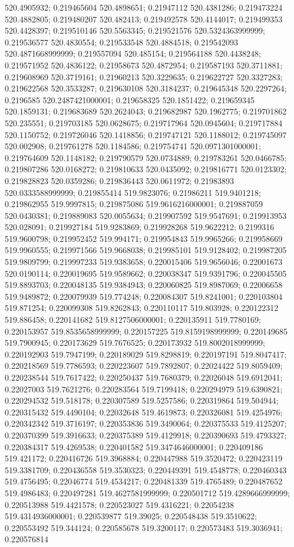 520.4905932; 0.219465604 520.4898651; 0.21947112 520.4381286; 0.219473224 520.4882805; 0.219480207 520.482413; 0.219492578 520.4144017; 0.219499353 520.4428397; 0.219510146 520.5563345; 0.219521576 520.5324363999999; 0.219536577 520.4830554; 0.219533548 520.4884518; 0.219542093 520.4871668999999; 0.219557094 520.485154; 0.219564188 520.4438248; 0.219571952 520.4836122; 0.21958673 520.4872954; 0.219587193 520.3711881; 0.219608969 520.3719161; 0.21960213 520.3229635; 0.219622727 520.3327283; 0.219622568 520.3533287; 0.219630108 520.3184237; 0.219645348 520.2297264; 0.2196585 520.2487421000001; 0.219658325 520.1851422; 0.219659345 520.1859131; 0.219683689 520.2624043; 0.219682987 520.1962775; 0.219701862 520.235551; 0.219703185 520.0628675; 0.219717964 520.0945604; 0.219717884 520.1150752; 0.219726046 520.1418856; 0.219747121 520.1188012; 0.219745097 520.002908; 0.219761278 520.1184586; 0.219754741 520.0971301000001; 0.219764609 520.1148182; 0.219790579 520.0734889; 0.219783261 520.0466785; 0.219807286 520.0168272; 0.219810633 520.0435092; 0.219816771 520.0123302; 0.219828823 520.0359286; 0.219836443 520.0611972; 0.21983893 520.0333588999999; 0.219855414 519.9823076; 0.21986211 519.9401218; 0.219862955 519.9997815; 0.219875086 519.9616216000001; 0.219887059 520.0430381; 0.219889083 520.0055634; 0.219907592 519.9547691; 0.219913953 520.028091; 0.219927184 519.9283869; 0.219928268 519.9622212; 0.2199316 519.9600798; 0.219952452 519.994171; 0.219954843 519.9965266; 0.219958669 519.9960555; 0.219971566 519.9668038; 0.219985101 519.9128402; 0.219987205 519.9809799; 0.219997233 519.9383658; 0.220015406 519.9656046; 0.22001673 520.0190114; 0.220019695 519.9589662; 0.220038347 519.9391796; 0.220045505 519.8893703; 0.220048135 519.9384943; 0.220060825 519.8987069; 0.22006658 519.9489872; 0.220079939 519.774248; 0.220084307 519.8241001; 0.220103804 519.871254; 0.220099308 519.8262843; 0.220110117 519.803928; 0.220122312 519.886458; 0.220141682 519.8127506000001; 0.220135911 519.7780169; 0.220153957 519.8535658999999; 0.220157225 519.8159198999999; 0.220149685 519.7900945; 0.220173629 519.7676525; 0.220173932 519.8002018999999; 0.220192903 519.7947199; 0.220189029 519.8298819; 0.220197191 519.8047417; 0.220218569 519.7786593; 0.220223607 519.7892807; 0.22024422 519.8059409; 0.220238544 519.7617422; 0.220250437 519.7680379; 0.22026048 519.6912041; 0.22027003 519.7621276; 0.220283564 519.7199418; 0.220294979 519.6390821; 0.220294532 519.518178; 0.220307589 519.5257586; 0.220319864 519.504944; 0.220315432 519.4490104; 0.22032648 519.4619873; 0.220326081 519.4254976; 0.220342342 519.3716197; 0.220353836 519.3490064; 0.220375533 519.4125207; 0.220370399 519.3916633; 0.220375389 519.4129918; 0.220390693 519.4793327; 0.220384317 519.4269538; 0.220401582 519.3474646000001; 0.220409186 519.421172; 0.220416726 519.3968884; 0.220447988 519.3520472; 0.220423119 519.3381709; 0.220436558 519.3530323; 0.220449391 519.4548778; 0.220460343 519.4756495; 0.22046774 519.4534217; 0.220481339 519.4765489; 0.220487652 519.4986483; 0.220497281 519.4627581999999; 0.220501712 519.4289666999999; 0.220513988 519.4421578; 0.220523027 519.4316221; 0.22054238 519.4314936000001; 0.220539877 519.39025; 0.220548438 519.3510622; 0.220553492 519.344124; 0.220585678 519.3200117; 0.220573483 519.3036941; 0.220576814 